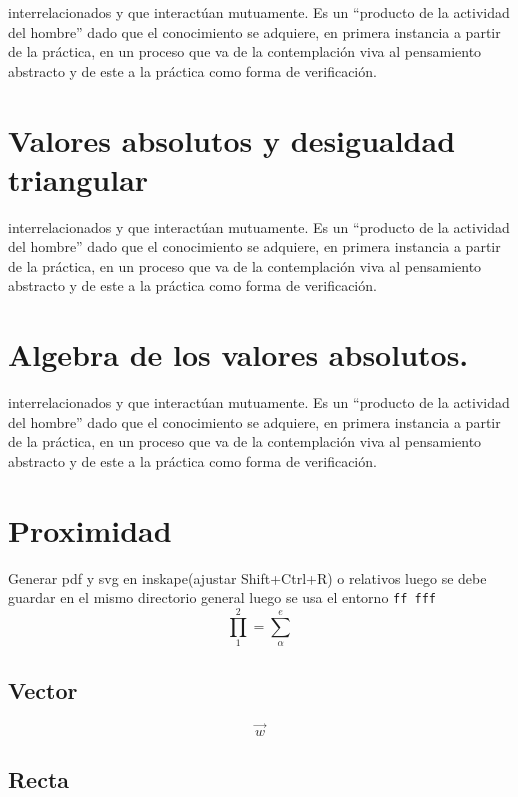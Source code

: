 \documentclass[12pt,]{krantz}
\theoremstyle{definition}
\theoremstyle{definition}
\theoremstyle{definition}
\theoremstyle{remark}
\begin{document}
interrelacionados y que interactúan mutuamente.
Es un ``producto de la actividad del hombre'' dado que el conocimiento
se adquiere, en primera instancia a partir de la práctica, en un proceso que
va de la contemplación viva al pensamiento abstracto y de este a la práctica
como forma de verificación.

\hypertarget{valores-absolutos-y-desigualdad-triangular}{%
\section{Valores absolutos y desigualdad triangular}\label{valores-absolutos-y-desigualdad-triangular}}

interrelacionados y que interactúan mutuamente.
Es un ``producto de la actividad del hombre'' dado que el conocimiento
se adquiere, en primera instancia a partir de la práctica, en un proceso que
va de la contemplación viva al pensamiento abstracto y de este a la práctica
como forma de verificación.

\hypertarget{algebra-de-los-valores-absolutos.}{%
\section{Algebra de los valores absolutos.}\label{algebra-de-los-valores-absolutos.}}

interrelacionados y que interactúan mutuamente.
Es un ``producto de la actividad del hombre'' dado que el conocimiento
se adquiere, en primera instancia a partir de la práctica, en un proceso que
va de la contemplación viva al pensamiento abstracto y de este a la práctica
como forma de verificación.

\hypertarget{proximidad}{%
\section{Proximidad}\label{proximidad}}

Generar pdf y svg en inskape(ajustar Shift+Ctrl+R) o relativos luego se debe guardar en el mismo directorio general luego se usa el entorno \texttt{ff\ fff}
\[\prod_1^2=\sum_{\alpha}^e\]

\hypertarget{vector}{%
\subsection{Vector}\label{vector}}

\[\vec{w}\]

\hypertarget{recta}{%
\subsection{Recta}\label{recta}}
\end{document}
